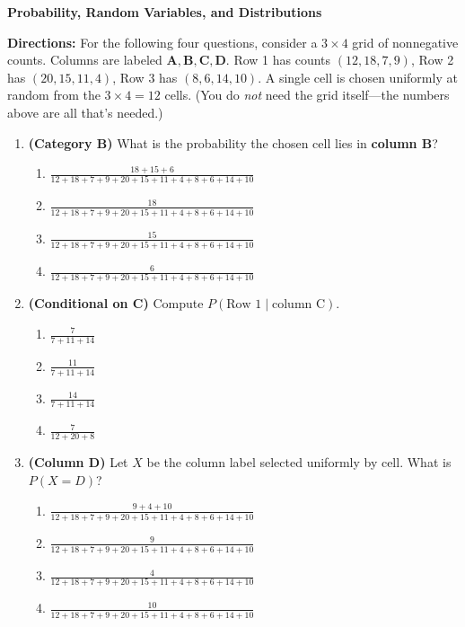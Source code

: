 \documentclass[12pt]{article}
\begin{document}
{\LARGE \textbf{Probability, Random Variables, and Distributions}}

\bigskip
\noindent\textbf{Directions:} For the following four questions, consider a $3\times 4$ grid of nonnegative counts.
Columns are labeled $\mathbf A,\mathbf B,\mathbf C,\mathbf D$.
Row 1 has counts $(12,18,7,9)$, Row 2 has $(20,15,11,4)$, Row 3 has $(8,6,14,10)$.
A single cell is chosen uniformly at random from the $3\times4=12$ cells.
(You do \emph{not} need the grid itself—the numbers above are all that’s needed.)

\begin{enumerate}[label=\textbf{S\arabic*.}]

\item \textbf{(Category B)} What is the probability the chosen cell lies in \textbf{column B}? 

\begin{enumerate}
\item $\displaystyle \frac{18+15+6}{12+18+7+9+20+15+11+4+8+6+14+10}$
\item $\displaystyle \frac{18}{12+18+7+9+20+15+11+4+8+6+14+10}$
\item $\displaystyle \frac{15}{12+18+7+9+20+15+11+4+8+6+14+10}$
\item $\displaystyle \frac{6}{12+18+7+9+20+15+11+4+8+6+14+10}$
\end{enumerate}

\item \textbf{(Conditional on C)} Compute $P(\text{Row 1}\mid \text{column C})$. 

\begin{enumerate}
\item $\displaystyle \frac{7}{7+11+14}$
\item $\displaystyle \frac{11}{7+11+14}$
\item $\displaystyle \frac{14}{7+11+14}$
\item $\displaystyle \frac{7}{12+20+8}$
\end{enumerate}

\item \textbf{(Column D)} Let $X$ be the column label selected uniformly by cell. What is $P(X=D)$? 

\begin{enumerate}
\item $\displaystyle \frac{9+4+10}{12+18+7+9+20+15+11+4+8+6+14+10}$
\item $\displaystyle \frac{9}{12+18+7+9+20+15+11+4+8+6+14+10}$
\item $\displaystyle \frac{4}{12+18+7+9+20+15+11+4+8+6+14+10}$
\item $\displaystyle \frac{10}{12+18+7+9+20+15+11+4+8+6+14+10}$
\end{enumerate}


\end{enumerate}
\end{document}
